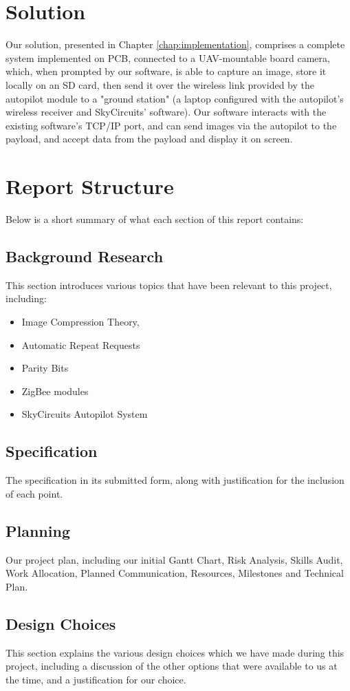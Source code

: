 \section{Solution}

Our solution, presented in Chapter \ref{chap:implementation}, comprises a complete system implemented on PCB, connected to a UAV-mountable board camera, which, 
when prompted by our software, is able to capture an image, store it locally 
on an SD card, then send it over the wireless link provided by the autopilot 
module to a "ground station" (a laptop configured with the autopilot's 
wireless receiver and SkyCircuits' software). Our software interacts with 
the existing software's TCP/IP port, and can send images via the autopilot 
to the payload, and accept data from the payload and display it on screen.

\section{Report Structure}

Below is a short summary of what each section of this report contains:

\subsection{Background Research}
This section introduces various topics that have been relevant to this 
project, including:
\begin{itemize}
\item Image Compression Theory, 
\item Automatic Repeat Requests
\item Parity Bits
\item ZigBee modules
\item SkyCircuits Autopilot System
\end{itemize}

\subsection{Specification}
The specification in its submitted form, along with justification for the 
inclusion of each point.

\subsection{Planning}
Our project plan, including our initial Gantt Chart, Risk Analysis, Skills 
Audit, Work Allocation, Planned Communication, Resources, Milestones and 
Technical Plan.

\subsection{Design Choices}
This section explains the various design choices which we have made during 
this project, including a discussion of the other options that were available 
to us at the time, and a justification for our choice.



